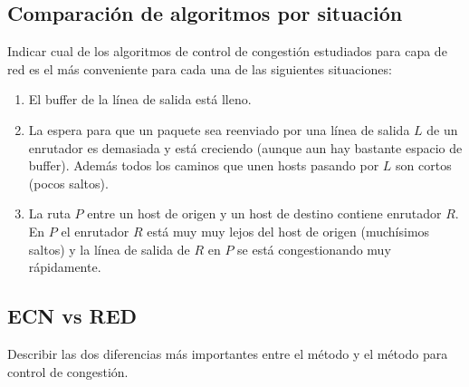 \documentclass[12pt]{report}
\begin{document}
\begin{exer}
	\subsection{Comparación de algoritmos por situación \sthree \steo}
	Indicar cual de los algoritmos de control de congestión estudiados para capa de red es el más conveniente para cada una de las siguientes situaciones:

	\begin{enumerate}
		\item El buffer de la línea de salida está lleno.
		\item La espera para que un paquete sea reenviado por una línea de salida $L$ de un enrutador es demasiada y está creciendo (aunque aun hay bastante espacio de buffer). Además todos los caminos que unen hosts pasando por $L$ son cortos (pocos saltos).
		\item La ruta $P$ entre un host de origen y un host de destino contiene enrutador $R$. En $P$ el enrutador $R$ está muy muy lejos del host de origen (muchísimos saltos) y la línea de salida de $R$ en $P$ se está congestionando muy rápidamente.
	\end{enumerate}
\end{exer}

\begin{exer}
	\subsection{ECN vs RED \stwo \steo}
	Describir las dos diferencias más importantes entre el método  y el método  para control de congestión.
\end{exer}
\end{document}
